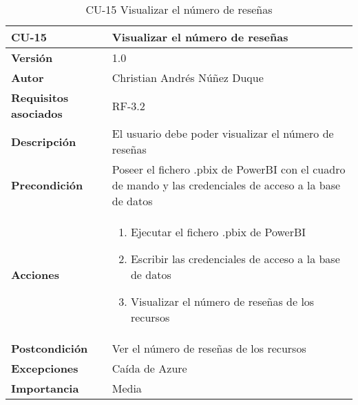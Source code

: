 \begin{table}[p]
	\centering
	\begin{tabularx}{\linewidth}{ p{} p{} }
		\toprule
		\textbf{CU-15}    & \textbf{Visualizar el número de reseñas}\\
		\toprule
		\textbf{Versión}              & 1.0    \\
		\textbf{Autor}                & Christian Andrés Núñez Duque \\
		\textbf{Requisitos asociados} & RF-3.2 \\
		\textbf{Descripción}          & El usuario debe poder visualizar el número de reseñas \\
		\textbf{Precondición}         & Poseer el fichero .pbix de PowerBI con el cuadro de mando y las credenciales de acceso a la base de datos \\
		\textbf{Acciones}             &
		\begin{enumerate}
			\def\labelenumi{\arabic{enumi}.}
			\tightlist
			\item Ejecutar el fichero .pbix de PowerBI
			\item Escribir las credenciales de acceso a la base de datos
			\item Visualizar el número de reseñas de los recursos
		\end{enumerate}\\
		\textbf{Postcondición}        & Ver el número de reseñas de los recursos \\
		\textbf{Excepciones}          & Caída de Azure \\
		\textbf{Importancia}          & Media \\
		\bottomrule
	\end{tabularx}
	\caption{CU-15 Visualizar el número de reseñas}
\end{table}

